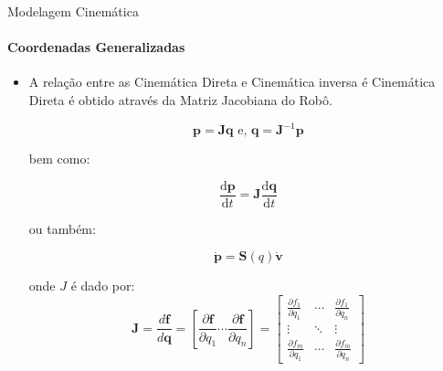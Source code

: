 \documentclass{beamer}
\begin{document}
\begin{frame}{Modelagem Cinemática}
    \framesubtitle{Coordenadas Generalizadas}
    \begin{itemize}
        \item A relação entre as Cinemática Direta e Cinemática inversa é Cinemática Direta é obtido através da Matriz Jacobiana do Robô.

              \begin{equation*}
                  \mathbf{p} = \mathbf{J}{\mathbf{q}}
                  \text{ e, }
                  \mathbf{q} = \mathbf{J}^{-1}{\mathbf{p}}
              \end{equation*}

              bem como:

              \begin{equation*}
                  \frac{\text{d}\mathbf{p}}{\text{d}t} = \mathbf{J}\frac{\text{d}\mathbf{q}}{\text{d}t}
              \end{equation*}

              ou também:

              \begin{equation*}\label{eq:jacob}
                  \mathbf{\dot{p}} =  \mathbf{S}(q)\mathbf{\dot{v}}
              \end{equation*}

              onde $J$ é dado por:
              \begin{equation*}
                  \mathbf{J}
                  =
                  \frac{d \mathbf{f}}{d \mathbf{q}}
                  =
                  \left[ \frac{\partial \mathbf{f}}{\partial q_1}
                      \cdots \frac{\partial \mathbf{f}}{\partial q_n} \right]
                  =
                  \begin{bmatrix}
                      \frac{\partial f_1}{\partial q_1} & \cdots &
                      \frac{\partial f_1}{\partial q_n}                   \\
                      \vdots                            & \ddots & \vdots \\
                      \frac{\partial f_m}{\partial q_1} & \cdots &
                      \frac{\partial f_m}{\partial q_n}
                  \end{bmatrix}
              \end{equation*}
    \end{itemize}
\end{frame}
\end{document}
